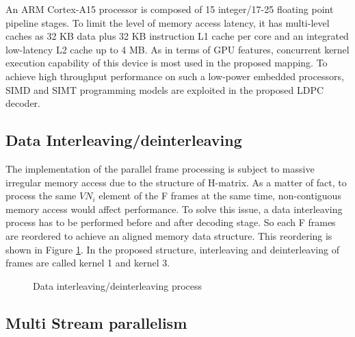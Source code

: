 \documentclass[conference]{IEEEtran}
\begin{document}
An ARM Cortex-A15 processor is composed of 15 integer/17-25 floating point pipeline stages. To limit the level of memory access latency, it has multi-level caches as 32 KB data plus 32 KB instruction L1 cache per core and an integrated low-latency L2 cache up to 4 MB. As in terms of GPU features, concurrent kernel execution capability of this device is most used in the proposed mapping. To achieve high throughput performance on such a low-power embedded processors, SIMD and SIMT programming models are exploited in the proposed LDPC decoder. 

\subsection{Data Interleaving/deinterleaving}
The implementation of the parallel frame processing is subject to massive irregular memory access due to the structure of H-matrix. As a matter of fact, to process the same $VN_i$ element of the F frames at the same time, non-contiguous memory access would affect performance. To solve this issue, a data interleaving process has to be performed before and after decoding stage. So each F frames are reordered to achieve an aligned memory data structure. This reordering is shown in Figure \ref{fig_intreleave}\cite{art_ldpc_cpu1}. In the proposed structure, interleaving and deinterleaving of frames are called {kernel 1} and {kernel 3}.

\begin{figure}[h]
\begin{centering}
\caption[width=.3\textwidth]{Data interleaving/deinterleaving process\cite{art_ldpc_cpu1}}
\label{fig_intreleave}
\end{centering}
\end{figure}

\subsection{Multi Stream parallelism}\label{subsec_proposed}
\end{document}
